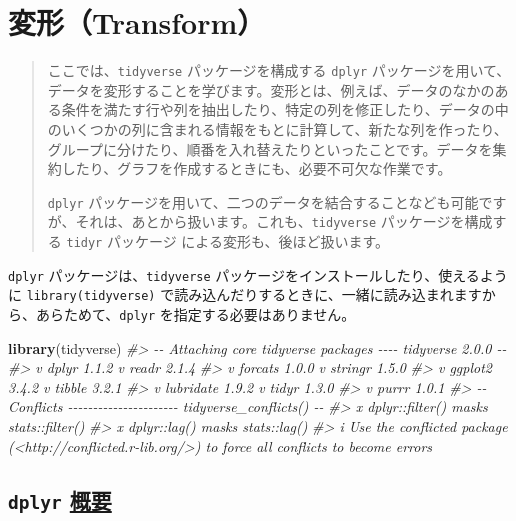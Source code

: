 \documentclass[
  xelatex, ja=standard]{bxjsbook}
\newenvironment{Shaded}{\begin{snugshade}}{\end{snugshade}}
\newcommand{\CommentTok}[1]{\textcolor[rgb]{0.56,0.35,0.01}{\textit{#1}}}
\newcommand{\FunctionTok}[1]{\textcolor[rgb]{0.13,0.29,0.53}{\textbf{#1}}}
\newcommand{\NormalTok}[1]{#1}
\theoremstyle{definition}
\theoremstyle{definition}
\theoremstyle{definition}
\theoremstyle{definition}
\theoremstyle{remark}
\begin{document}
\hypertarget{transform}{%
\chapter{変形（Transform）}\label{transform}}

\begin{quote}
ここでは、\texttt{tidyverse} パッケージを構成する \texttt{dplyr} パッケージを用いて、データを変形することを学びます。変形とは、例えば、データのなかのある条件を満たす行や列を抽出したり、特定の列を修正したり、データの中のいくつかの列に含まれる情報をもとに計算して、新たな列を作ったり、グループに分けたり、順番を入れ替えたりといったことです。データを集約したり、グラフを作成するときにも、必要不可欠な作業です。

\texttt{dplyr} パッケージを用いて、二つのデータを結合することなども可能ですが、それは、あとから扱います。これも、\texttt{tidyverse} パッケージを構成する \texttt{tidyr} パッケージ による変形も、後ほど扱います。
\end{quote}

\texttt{dplyr} パッケージは、\texttt{tidyverse} パッケージをインストールしたり、使えるように \texttt{library(tidyverse)} で読み込んだりするときに、一緒に読み込まれますから、あらためて、\texttt{dplyr} を指定する必要はありません。

\begin{Shaded}
\begin{Highlighting}[]
\FunctionTok{library}\NormalTok{(tidyverse)}
\CommentTok{\#\textgreater{} {-}{-} Attaching core tidyverse packages {-}{-}{-}{-} tidyverse 2.0.0 {-}{-}}
\CommentTok{\#\textgreater{} v dplyr     1.1.2     v readr     2.1.4}
\CommentTok{\#\textgreater{} v forcats   1.0.0     v stringr   1.5.0}
\CommentTok{\#\textgreater{} v ggplot2   3.4.2     v tibble    3.2.1}
\CommentTok{\#\textgreater{} v lubridate 1.9.2     v tidyr     1.3.0}
\CommentTok{\#\textgreater{} v purrr     1.0.1     }
\CommentTok{\#\textgreater{} {-}{-} Conflicts {-}{-}{-}{-}{-}{-}{-}{-}{-}{-}{-}{-}{-}{-}{-}{-}{-}{-}{-}{-}{-}{-} tidyverse\_conflicts() {-}{-}}
\CommentTok{\#\textgreater{} x dplyr::filter() masks stats::filter()}
\CommentTok{\#\textgreater{} x dplyr::lag()    masks stats::lag()}
\CommentTok{\#\textgreater{} i Use the conflicted package (\textless{}http://conflicted.r{-}lib.org/\textgreater{}) to force all conflicts to become errors}
\end{Highlighting}
\end{Shaded}

\hypertarget{dplyr-ux6982ux8981}{%
\section{\texorpdfstring{\texttt{dplyr} \href{https://dplyr.tidyverse.org}{概要}}{dplyr 概要}}\label{dplyr-ux6982ux8981}}
\end{document}
